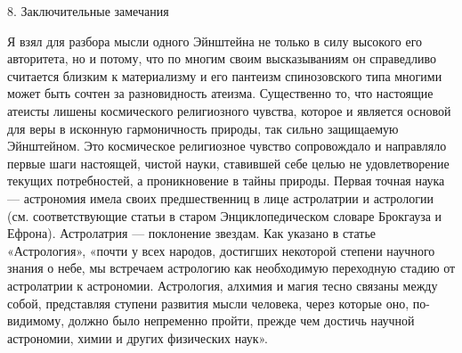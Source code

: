 8. Заключительные замечания

Я взял  для разбора мысли одного  Эйнштейна не только в  силу высокого
его  авторитета,  но  и  потому, что  по  многим  своим  высказываниям
он  справедливо  считается  близким  к  материализму  и  его  пантеизм
спинозовского типа многими может быть сочтен за разновидность атеизма.
Существенно то, что настоящие атеисты лишены космического религиозного
чувства, которое и является основой  для веры в исконную гармоничность
природы, так сильно защищаемую Эйнштейном. Это космическое религиозное
чувство  сопровождало  и  направляло  первые  шаги  настоящей,  чистой
науки, ставившей себе целью  не удовлетворение текущих потребностей, а
проникновение  в тайны  природы.  Первая точная  наука ---  астрономия
имела  своих  предшественниц  в  лице астролатрии  и  астрологии  (см.
соответствующие статьи в старом  Энциклопедическом словаре Брокгауза и
Ефрона).  Астролатрия ---  поклонение  звездам. Как  указано в  статье
«Астрология»,  «почти  у  всех народов,  достигших  некоторой  степени
научного  знания  о  небе,  мы встречаем  астрологию  как  необходимую
переходную стадию  от астролатрии к астрономии.  Астрология, алхимия и
магия тесно  связаны между  собой, представляя ступени  развития мысли
человека,  через  которые  оно, по-видимому,  должно  было  непременно
пройти,  прежде  чем  достичь   научной  астрономии,  химии  и  других
физических наук».

